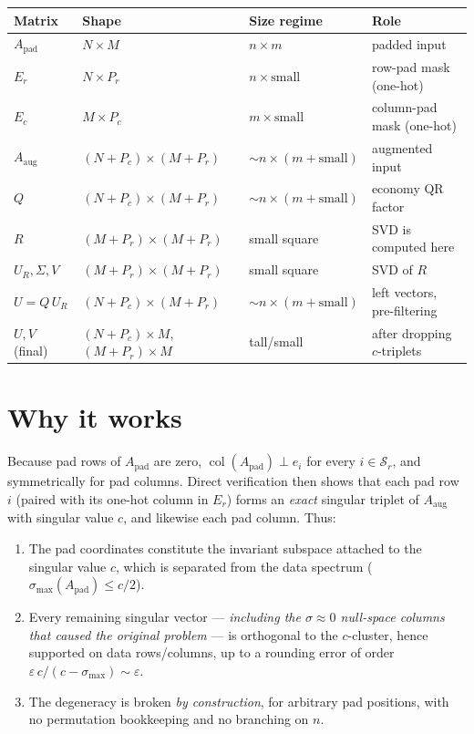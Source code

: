 \documentclass[11pt]{article}
\newcommand{\Apad}{A_{\mathrm{pad}}}
\newcommand{\Aaug}{A_{\mathrm{aug}}}
\begin{document}
\begin{center}
\begin{tabular}{@{}llll@{}}
\toprule
Matrix & Shape & Size regime & Role \\
\midrule
$\Apad$            & $N \times M$                        & $n \times m$            & padded input \\
$E_r$              & $N \times P_r$                      & $n \times \text{small}$ & row-pad mask (one-hot) \\
$E_c$              & $M \times P_c$                      & $m \times \text{small}$ & column-pad mask (one-hot) \\
$\Aaug$            & $(N{+}P_c) \times (M{+}P_r)$        & $\sim n \times (m{+}\text{small})$ & augmented input \\
$Q$                & $(N{+}P_c) \times (M{+}P_r)$        & $\sim n \times (m{+}\text{small})$ & economy QR factor \\
$R$                & $(M{+}P_r) \times (M{+}P_r)$        & small square            & SVD is computed here \\
$U_R, \Sigma, V$   & $(M{+}P_r) \times (M{+}P_r)$        & small square            & SVD of $R$ \\
$U = Q\,U_R$       & $(N{+}P_c) \times (M{+}P_r)$        & $\sim n \times (m{+}\text{small})$ & left vectors, pre-filtering \\
$U, V$ (final)     & $(N{+}P_c) \times M$,\; $(M{+}P_r) \times M$ & tall/small     & after dropping $c$-triplets \\
\bottomrule
\end{tabular}
\end{center}

\section{Why it works}

Because pad rows of $\Apad$ are zero, $\operatorname{col}(\Apad) \perp e_i$ for
every $i \in \mathcal{S}_r$, and symmetrically for pad columns. Direct
verification then shows that each pad row $i$ (paired with its one-hot column in
$E_r$) forms an \emph{exact} singular triplet of $\Aaug$ with singular value $c$,
and likewise each pad column. Thus:
\begin{enumerate}[itemsep=1pt]
  \item The pad coordinates constitute the invariant subspace attached to the
        singular value $c$, which is separated from the data spectrum
        ($\sigma_{\max}(\Apad) \le c/2$).
  \item Every remaining singular vector --- \emph{including the $\sigma \approx 0$
        null-space columns that caused the original problem} --- is orthogonal to
        the $c$-cluster, hence supported on data rows/columns, up to a rounding
        error of order $\varepsilon\, c / (c - \sigma_{\max}) \sim \varepsilon$.
  \item The degeneracy is broken \emph{by construction}, for arbitrary pad
        positions, with no permutation bookkeeping and no branching on $n$.
\end{enumerate}
\end{document}

